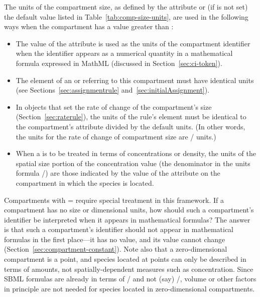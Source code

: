 The units of the compartment size, as defined by the 
attribute or (if  is not set) the default
  value listed in Table~\vref{tab:comp-size-units}, are used in
the following ways when the compartment has a
 value greater than :
\begin{itemize}

\item The value of the  attribute is used
  as the units of the compartment identifier when the identifier
  appears as a numerical quantity in a mathematical formula
  expressed in MathML (discussed in Section~\ref{sec:ci-token}).

\item The  element of an \AssignmentRule or
  \InitialAssignment referring to this compartment must have
  identical units (see Sections~\ref{sec:assignmentrule}
  and~\ref{sec:initialAssignment}).

\item In \RateRule objects that set the rate of change of the
  compartment's size (Section~\ref{sec:raterule}), the units of
  the rule's  element must be identical to
  the compartment's  attribute divided by
  the default  units.  (In other words, the units
  for the rate of change of compartment size are
  / units.)

\item When a \Species is to be treated in terms of concentrations
  or density, the units of the spatial size portion of the
  concentration value (\ie the denominator in the units formula
  /) are those indicated by the
  value of the  attribute on the compartment in which
  the species is located.

\vspace*{-1ex}
\end{itemize}

Compartments with = require
special treatment in this framework.  If a compartment has no size
or dimensional units, how should such a compartment's identifier
be interpreted when it appears in mathematical formulas?  The
answer is that such a compartment's identifier should not appear
in mathematical formulas in the first place---it has no value, and
its value cannot change (Section~\ref{sec:compartment-constant}).
Note also that a zero-dimensional compartment is a point, and
species located at points can only be described in terms of
amounts, not spatially-dependent measures such as concentration.
Since SBML \KineticLaw formulas are already in terms of
/ and not (say)
/, volume or other factors
in principle are not needed for species located in
zero-dimensional compartments.


